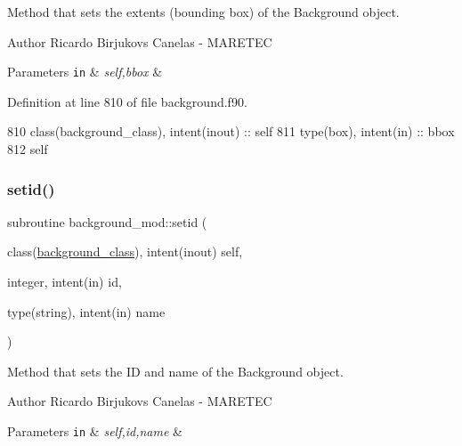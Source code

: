 Method that sets the extents (bounding box) of the Background object. 

\begin{DoxyAuthor}{Author}
Ricardo Birjukovs Canelas -\/ M\+A\+R\+E\+T\+EC 
\end{DoxyAuthor}

\begin{DoxyParams}[1]{Parameters}
\mbox{\tt in}  & {\em self,bbox} & \\
\hline
\end{DoxyParams}


Definition at line 810 of file background.\+f90.


\begin{DoxyCode}
810     \textcolor{keywordtype}{class}(background\_class), \textcolor{keywordtype}{intent(inout)} :: self
811     \textcolor{keywordtype}{type}(box), \textcolor{keywordtype}{intent(in)} :: bbox
812     self%
\end{DoxyCode}
\mbox{\label{namespacebackground__mod_a4feaccf688558d8590ece4f09c65c977}} 
\subsubsection{\texorpdfstring{setid()}{setid()}}
{\footnotesize\ttfamily subroutine background\+\_\+mod\+::setid (\begin{DoxyParamCaption}\item[{class(\mbox{\hyperlink{structbackground__mod_1_1background__class}{background\+\_\+class}}), intent(inout)}]{self,  }\item[{integer, intent(in)}]{id,  }\item[{type(string), intent(in)}]{name }\end{DoxyParamCaption})\hspace{0.3cm}{\ttfamily [private]}}



Method that sets the ID and name of the Background object. 

\begin{DoxyAuthor}{Author}
Ricardo Birjukovs Canelas -\/ M\+A\+R\+E\+T\+EC 
\end{DoxyAuthor}

\begin{DoxyParams}[1]{Parameters}
\mbox{\tt in}  & {\em self,id,name} & \\
\hline
\end{DoxyParams}


